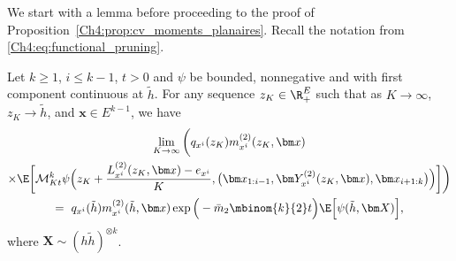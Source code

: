 \begin{refsegment}
We start with a lemma before proceeding to the proof of Proposition~\ref{Ch4:prop:cv_moments_planaires}. Recall the notation from
\eqref{Ch4:eq:functional_pruning}.
\begin{lem}\label{Ch4:cor:cv_m_cal_psi}
Let $k\geq 1$, $i\leq k-1$, $t>0$ and $\psi$ be bounded, nonnegative and with first component continuous at $\tilde h$. For any sequence $z_K \in \R_+^E$ such that as $K\to\infty$, $z_K\to \tilde h$, and $\bm x\in E^{k-1}$, we have
\begin{multline*}
    \lim_{K\to\infty}\bigg( q_{x^i}(z_K) m^{(2)}_{x^i}(z_K,\bm x)\\
    \times
      \E\bigg[ \mathcal{M}^k_{Kt}\psi\Big(z_K+\frac{L^{(2)}_{x^i}(z_K, \bm x)- e_{x^i}}{K}, \big(\bm x_{1:i-1}, \bm Y^{(2)}_{x^i}(z_K, \bm x), \bm x_{i+1:k}\big) \Big)\bigg]\bigg)\\ =\ q_{x^i}(\tilde h)m^{(2)}_{x^i}(\tilde h,\bm x)\exp\Big(-\bar m_2\mbinom{k}{2}t\Big)\E\Big[\psi(\tilde h, \bm X)\Big],
\end{multline*}
where $\bm X\sim (h\tilde h)^{\otimes k}$.
\end{lem}


\end{refsegment}
